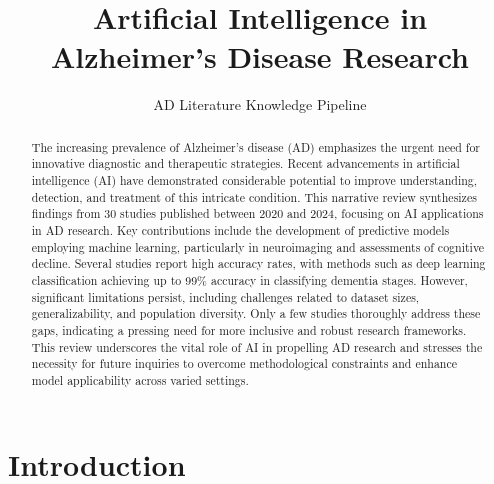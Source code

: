 \documentclass{MITcsail}
\title{Artificial Intelligence in Alzheimer's Disease Research}
\author{AD Literature Knowledge Pipeline\\
\vspace{1em}
\normalfont{\small Automated narrative literature review}}
\begin{document}
\maketitle
\thispagestyle{firstpagestyle}

\begin{abstract}
The increasing prevalence of Alzheimer’s disease (AD) emphasizes the urgent need for innovative diagnostic and therapeutic strategies. Recent advancements in artificial intelligence (AI) have demonstrated considerable potential to improve understanding, detection, and treatment of this intricate condition. This narrative review synthesizes findings from 30 studies published between 2020 and 2024, focusing on AI applications in AD research. Key contributions include the development of predictive models employing machine learning, particularly in neuroimaging and assessments of cognitive decline. Several studies report high accuracy rates, with methods such as deep learning classification achieving up to 99\% accuracy in classifying dementia stages. However, significant limitations persist, including challenges related to dataset sizes, generalizability, and population diversity. Only a few studies thoroughly address these gaps, indicating a pressing need for more inclusive and robust research frameworks. This review underscores the vital role of AI in propelling AD research and stresses the necessity for future inquiries to overcome methodological constraints and enhance model applicability across varied settings.
\end{abstract}

\section{Introduction}
\end{document}
